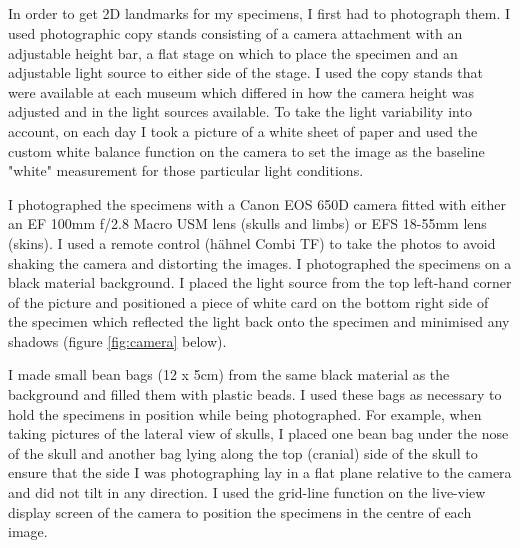 \newpage
\subsection{}


	In order to get 2D landmarks for my specimens, I first had to photograph them. I used photographic copy stands consisting of a camera attachment with an adjustable height bar, a flat stage on which to place the specimen and an adjustable light source to either side of the stage. I used the copy stands that were available at each museum which differed in how the camera height was adjusted and in the light sources available.
	To take the light variability into account, on each day I took a picture of a white sheet of paper and used the custom white balance function on the camera to set the image as the baseline "white" measurement for those particular light conditions.
	
	I photographed the specimens with a Canon EOS 650D camera fitted with either an EF 100mm f/2.8 Macro USM lens (skulls and limbs) or EFS 18-55mm lens (skins). I used a remote control (h\"ahnel Combi TF) to take the photos to avoid shaking the camera and distorting the images. I photographed the specimens on a black material background. I placed the light source from the top left-hand corner of the picture and positioned a piece of white card on the bottom right side of the specimen which reflected the light back onto the specimen and minimised any shadows (figure \ref{fig:camera} below).

	I made small bean bags (12 x 5cm) from the same black material as the background and filled them with plastic beads. I used these bags as necessary to hold the specimens in position while being photographed. For example, when taking pictures of the lateral view of skulls, I placed one bean bag under the nose of the skull and another bag lying along the top (cranial) side of the skull to ensure that the side I was photographing lay in a flat plane relative to the camera and did not tilt in any direction. 
	I used the grid-line function on the live-view display screen of the camera to position the specimens in the centre of each image. 

